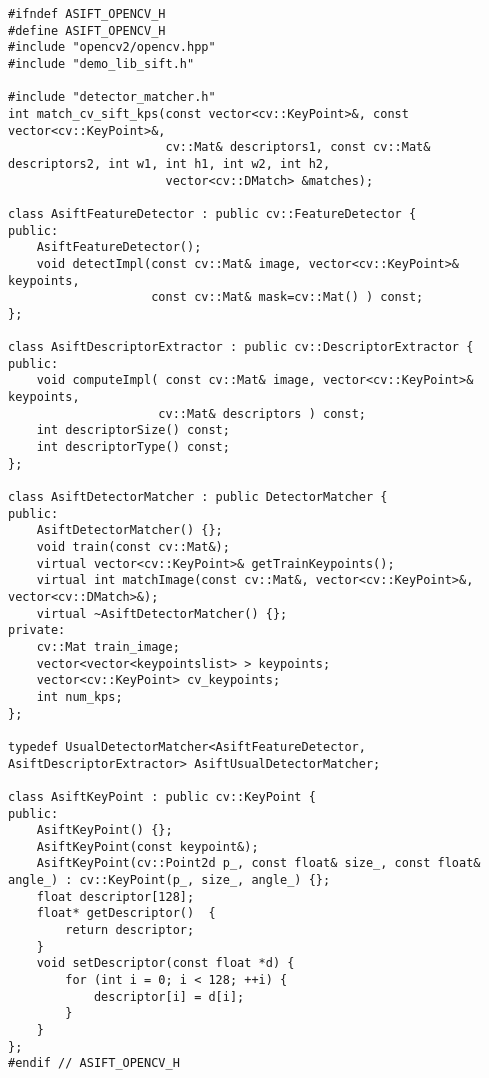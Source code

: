 \begin{lstlisting}
#ifndef ASIFT_OPENCV_H
#define ASIFT_OPENCV_H
#include "opencv2/opencv.hpp"
#include "demo_lib_sift.h"

#include "detector_matcher.h"
int match_cv_sift_kps(const vector<cv::KeyPoint>&, const vector<cv::KeyPoint>&,
                      cv::Mat& descriptors1, const cv::Mat& descriptors2, int w1, int h1, int w2, int h2,
                      vector<cv::DMatch> &matches);

class AsiftFeatureDetector : public cv::FeatureDetector {
public:
    AsiftFeatureDetector();
    void detectImpl(const cv::Mat& image, vector<cv::KeyPoint>& keypoints,
                    const cv::Mat& mask=cv::Mat() ) const;
};

class AsiftDescriptorExtractor : public cv::DescriptorExtractor {
public:
    void computeImpl( const cv::Mat& image, vector<cv::KeyPoint>& keypoints,
                     cv::Mat& descriptors ) const;
    int descriptorSize() const;
    int descriptorType() const;
};

class AsiftDetectorMatcher : public DetectorMatcher {
public:
    AsiftDetectorMatcher() {};
    void train(const cv::Mat&);
    virtual vector<cv::KeyPoint>& getTrainKeypoints();
    virtual int matchImage(const cv::Mat&, vector<cv::KeyPoint>&, vector<cv::DMatch>&);
    virtual ~AsiftDetectorMatcher() {};
private:
    cv::Mat train_image;
    vector<vector<keypointslist> > keypoints;
    vector<cv::KeyPoint> cv_keypoints;
    int num_kps;
};

typedef UsualDetectorMatcher<AsiftFeatureDetector, AsiftDescriptorExtractor> AsiftUsualDetectorMatcher;

class AsiftKeyPoint : public cv::KeyPoint {
public:
    AsiftKeyPoint() {};
    AsiftKeyPoint(const keypoint&);
    AsiftKeyPoint(cv::Point2d p_, const float& size_, const float& angle_) : cv::KeyPoint(p_, size_, angle_) {};
    float descriptor[128];
    float* getDescriptor()  {
        return descriptor;
    }
    void setDescriptor(const float *d) {
        for (int i = 0; i < 128; ++i) {
            descriptor[i] = d[i];
        }
    }
};
#endif // ASIFT_OPENCV_H
\end{lstlisting}
